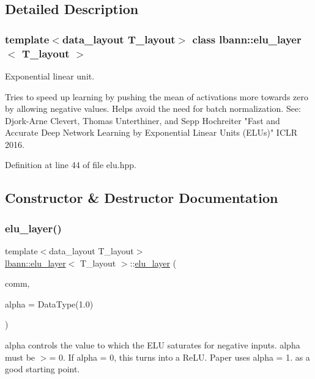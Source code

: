 \subsection{Detailed Description}
\subsubsection*{template$<$data\+\_\+layout T\+\_\+layout$>$\newline
class lbann\+::elu\+\_\+layer$<$ T\+\_\+layout $>$}

Exponential linear unit.

Tries to speed up learning by pushing the mean of activations more towards zero by allowing negative values. Helps avoid the need for batch normalization. See\+: Djork-\/\+Arne Clevert, Thomas Unterthiner, and Sepp Hochreiter "Fast and Accurate Deep Network Learning by Exponential Linear Units (E\+L\+Us)" I\+C\+LR 2016. 

Definition at line 44 of file elu.\+hpp.



\subsection{Constructor \& Destructor Documentation}
\mbox{\label{classlbann_1_1elu__layer_a37a371015add326278f7a537ade73e30}} 
\subsubsection{\texorpdfstring{elu\+\_\+layer()}{elu\_layer()}}
{\footnotesize\ttfamily template$<$data\+\_\+layout T\+\_\+layout$>$ \\
\hyperlink{classlbann_1_1elu__layer}{lbann\+::elu\+\_\+layer}$<$ T\+\_\+layout $>$\+::\hyperlink{classlbann_1_1elu__layer}{elu\+\_\+layer} (\begin{DoxyParamCaption}\item[{\hyperlink{classlbann_1_1lbann__comm}{lbann\+\_\+comm} $\ast$}]{comm,  }\item[{Data\+Type}]{alpha = {\ttfamily DataType(1.0)} }\end{DoxyParamCaption})\hspace{0.3cm}{\ttfamily [inline]}}

alpha controls the value to which the E\+LU saturates for negative inputs. alpha must be $>$= 0. If alpha = 0, this turns into a Re\+LU. Paper uses alpha = 1. as a good starting point. 

